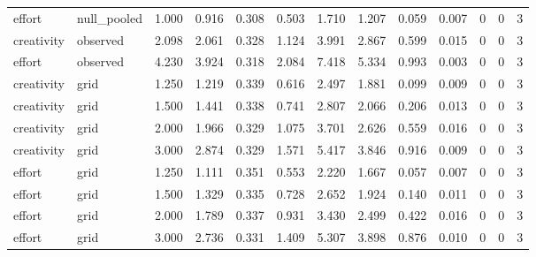 \begin{table}[!h]
{\begin{tabular}[t]{llrrrrrrrrrrr}
effort & null\_pooled & 1.000 & 0.916 & 0.308 & 0.503 & 1.710 & 1.207 & 0.059 & 0.007 & 0 & 0 & 3\\
creativity & observed & 2.098 & 2.061 & 0.328 & 1.124 & 3.991 & 2.867 & 0.599 & 0.015 & 0 & 0 & 3\\
effort & observed & 4.230 & 3.924 & 0.318 & 2.084 & 7.418 & 5.334 & 0.993 & 0.003 & 0 & 0 & 3\\
creativity & grid & 1.250 & 1.219 & 0.339 & 0.616 & 2.497 & 1.881 & 0.099 & 0.009 & 0 & 0 & 3\\
\addlinespace
creativity & grid & 1.500 & 1.441 & 0.338 & 0.741 & 2.807 & 2.066 & 0.206 & 0.013 & 0 & 0 & 3\\
creativity & grid & 2.000 & 1.966 & 0.329 & 1.075 & 3.701 & 2.626 & 0.559 & 0.016 & 0 & 0 & 3\\
creativity & grid & 3.000 & 2.874 & 0.329 & 1.571 & 5.417 & 3.846 & 0.916 & 0.009 & 0 & 0 & 3\\
effort & grid & 1.250 & 1.111 & 0.351 & 0.553 & 2.220 & 1.667 & 0.057 & 0.007 & 0 & 0 & 3\\
effort & grid & 1.500 & 1.329 & 0.335 & 0.728 & 2.652 & 1.924 & 0.140 & 0.011 & 0 & 0 & 3\\
\addlinespace
effort & grid & 2.000 & 1.789 & 0.337 & 0.931 & 3.430 & 2.499 & 0.422 & 0.016 & 0 & 0 & 3\\
effort & grid & 3.000 & 2.736 & 0.331 & 1.409 & 5.307 & 3.898 & 0.876 & 0.010 & 0 & 0 & 3\\
\bottomrule
\end{tabular}}
\end{table}